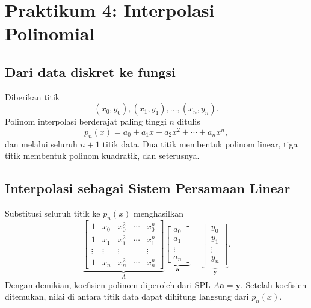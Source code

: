 \chapter{Praktikum 4: Interpolasi Polinomial}


\section{Dari data diskret ke fungsi}
Diberikan titik
\[
(x_0,y_0),(x_1,y_1),\ldots,(x_n,y_n).
\]
Polinom interpolasi berderajat paling tinggi $n$ ditulis
\begin{equation}
 p_n(x)=a_0+a_1x+a_2x^2+\cdots+a_nx^n,
\end{equation}
dan melalui seluruh $n+1$ titik data. Dua titik membentuk polinom linear, tiga titik membentuk polinom kuadratik, dan seterusnya.

\section{Interpolasi sebagai Sistem Persamaan Linear}
Substitusi seluruh titik ke $p_n(x)$ menghasilkan
\begin{equation}
\underbrace{\begin{bmatrix}
1&x_0&x_0^2&\cdots&x_0^n\\
1&x_1&x_1^2&\cdots&x_1^n\\
\vdots&\vdots&\vdots&&\vdots\\
1&x_n&x_n^2&\cdots&x_n^n
\end{bmatrix}}_{A}
\underbrace{\begin{bmatrix}a_0\\a_1\\\vdots\\a_n\end{bmatrix}}_{\mathbf a}
=
\underbrace{\begin{bmatrix}y_0\\y_1\\\vdots\\y_n\end{bmatrix}}_{\mathbf y}.
\label{eq:vandermonde}
\end{equation}
Dengan demikian, koefisien polinom diperoleh dari SPL $A\mathbf a=\mathbf y$. Setelah koefisien ditemukan, nilai di antara titik data dapat dihitung langsung dari $p_n(x)$.

